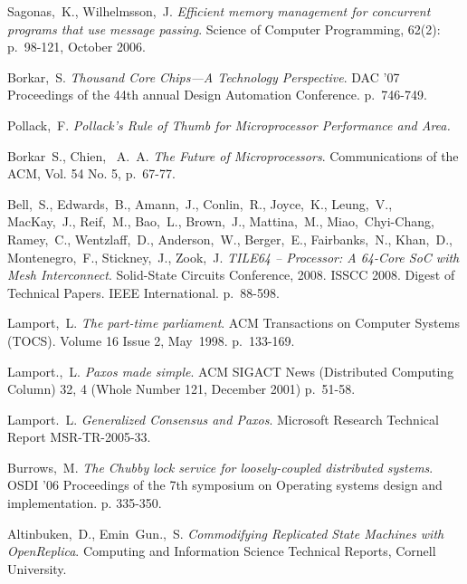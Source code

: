 \documentclass[english,11pt]{l4proj}
\begin{document}
\clearpage
\begin{thebibliography}{99}

     Sagonas,~K., Wilhelmsson,~J. \emph{Efficient memory
        management for concurrent programs that use message passing}. Science of
        Computer Programming, 62(2): p.~98-121, October 2006.

     Borkar,~S. \emph{Thousand Core Chips—A Technology
        Perspective}. DAC '07 Proceedings of the 44th annual Design Automation
        Conference. p.~746-749.

     Pollack,~F. \emph{Pollack's Rule of Thumb for
        Microprocessor Performance and Area.}

     Borkar~S., Chien,~ A.~A. \emph{The Future
        of Microprocessors}. Communications of the ACM, Vol. 54 No. 5, p.~67-77.

     Bell,~S., Edwards,~B., Amann,~J., Conlin,~R.,
        Joyce,~K., Leung,~V., MacKay,~J., Reif,~M., Bao,~L., Brown,~J.,
        Mattina,~M., Miao,~Chyi-Chang, Ramey,~C., Wentzlaff,~D.,
        Anderson,~W., Berger,~E., Fairbanks,~N., Khan,~D., Montenegro,~F.,
        Stickney,~J., Zook,~J. \emph{TILE64 -- Processor: A 64-Core SoC with
        Mesh Interconnect}. Solid-State Circuits Conference, 2008. ISSCC 2008.
        Digest of Technical Papers. IEEE International. p.~88-598.

     Lamport,~L. \emph{The part-time parliament}. ACM
        Transactions on Computer Systems (TOCS). Volume 16 Issue 2, May~1998.
        p.~133-169.

     Lamport.,~L. \emph{Paxos made simple}. ACM SIGACT
        News (Distributed Computing Column) 32, 4 (Whole Number 121, December
        2001) p.~51-58.

     Lamport.~L. \emph{Generalized Consensus and
        Paxos}. Microsoft Research Technical Report MSR-TR-2005-33.

     Burrows,~M. \emph{The Chubby lock service for
        loosely-coupled distributed systems}. OSDI '06 Proceedings of the 7th
        symposium on Operating systems design and implementation. p. 335-350.

     Altinbuken,~D., Emin~Gun.,~S. \emph{Commodifying
        Replicated State Machines with OpenReplica}. Computing and
        Information Science Technical Reports, Cornell University.


\end{thebibliography}
\end{document}
